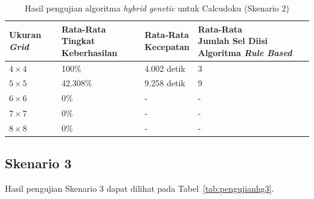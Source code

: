 \begin{table}
\centering
\captionsetup{justification=centering}
\caption[Hasil pengujian algoritma \textit{hybrid genetic} untuk Calcudoku (Skenario 2)]{Hasil pengujian algoritma \textit{hybrid genetic} untuk Calcudoku (Skenario 2)}
\begin{tabular}{| l | l | l | l |}
\hline
Ukuran \textit{Grid} & \makecell[l]{Rata-Rata \\ Tingkat Keberhasilan} & \makecell[l]{Rata-Rata \\ Kecepatan} & \makecell[l]{Rata-Rata \\ Jumlah Sel Diisi Algoritma \textit{Rule Based}} \\
\hline \hline
\begin{math}4 \times 4\end{math} & 100\% & 4.002 detik & 3 \\
\hline
\begin{math}5 \times 5\end{math} & 42.308\% & 9.258 detik & 9 \\
\hline
\begin{math}6 \times 6\end{math} & 0\% & - & - \\
\hline
\begin{math}7 \times 7\end{math} & 0\% & - & - \\
\hline
\begin{math}8 \times 8\end{math} & 0\% & - & - \\
\hline
\end{tabular}
\label{tab:pengujianhg2}
\end{table}

\subsection{Skenario 3}
\label{sec:skenario3}

Hasil pengujian Skenario 3 dapat dilihat pada Tabel~\ref{tab:pengujianhg3}.

